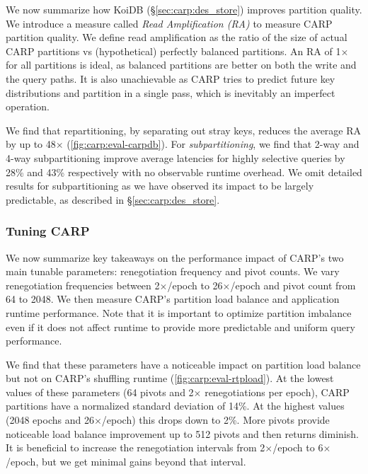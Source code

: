We now summarize how KoiDB (\S\ref{sec:carp:des_store}) improves partition quality.
We introduce a measure called \emph{Read Amplification (RA)} to measure CARP partition quality.
We define read amplification as the ratio of the size of actual CARP partitions vs (hypothetical)
perfectly balanced partitions.
An RA of 1$\times$ for all partitions is ideal, as balanced partitions are better on both the write
and the query paths.
It is also unachievable as CARP tries to predict future key distributions and partition in a single
pass, which is inevitably an imperfect operation.

We find that repartitioning, by separating out stray keys, reduces the average RA by up to
48$\times$ (\cref{fig:carp:eval-carpdb}).
For \emph{subpartitioning}, we find that 2-way and 4-way subpartitioning improve average latencies
for highly selective queries by 28\% and 43\% respectively with no observable runtime overhead.
We omit detailed results for subpartitioning as we have observed its impact to be largely
predictable, as described in \S\ref{sec:carp:des_store}.

\subsubsection{Tuning CARP}
\label{sec:carp:eval_tune}

We now summarize key takeaways on the performance impact of CARP's two main tunable parameters:
renegotiation frequency and pivot counts.
We vary renegotiation frequencies between 2$\times$/epoch to 26$\times$/epoch and pivot count from
64 to 2048.
We then measure CARP's partition load balance and application runtime performance.
Note that it is important to optimize partition imbalance even if it does not affect runtime to
provide more predictable and uniform query performance.

\figCarpEvalTuneLoad

We find that these parameters have a noticeable impact on partition load balance but not on CARP's
shuffling runtime (\cref{fig:carp:eval-rtpload}).
At the lowest values of these parameters (64 pivots and 2$\times$ renegotiations per epoch), CARP
partitions have a normalized standard deviation of 14\%.
At the highest values (2048 epochs and 26$\times$/epoch) this drops down to 2\%.
More pivots provide noticeable load balance improvement up to 512 pivots and then returns diminish.
It is beneficial to increase the renegotiation intervals from 2$\times$/epoch to 6$\times$/epoch,
but we get minimal gains beyond that interval.

